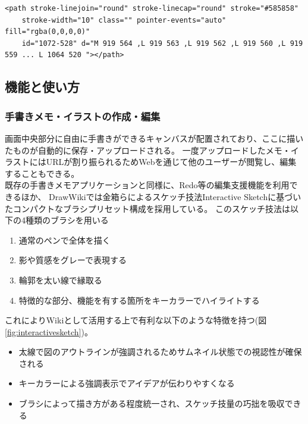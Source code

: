 \begin{lstlisting}[caption=図\ref{fig:tegakipath}の実体, label=code:tegakipathcode]
    <path stroke-linejoin="round" stroke-linecap="round" stroke="#585858"
    stroke-width="10" class="" pointer-events="auto" fill="rgba(0,0,0,0)"
    id="1072-528" d="M 919 564 ,L 919 563 ,L 919 562 ,L 919 560 ,L 919 559 ... L 1064 520 "></path>
\end{lstlisting}


\subsection{機能と使い方}

\subsubsection{手書きメモ・イラストの作成・編集}

画面中央部分に自由に手書きができるキャンバスが配置されており、ここに描いたものが自動的に保存・アップロードされる。
一度アップロードしたメモ・イラストにはURLが割り振られるためWebを通じて他のユーザーが閲覧し、編集することもできる。
\\
既存の手書きメモアプリケーションと同様に、Redo等の編集支援機能を利用できるほか、
DrawWikiでは金箱らによるスケッチ技法Interactive Sketch\cite{130004638060}に基づいたコンパクトなブラシプリセット構成を採用している。
このスケッチ技法は以下の4種類のブラシを用いる
\begin{enumerate}
    \item 通常のペンで全体を描く
    \item 影や質感をグレーで表現する
    \item 輪郭を太い線で縁取る
    \item 特徴的な部分、機能を有する箇所をキーカラーでハイライトする
\end{enumerate}
これによりWikiとして活用する上で有利な以下のような特徴を持つ(図\ref{fig:interactivesketch})。
\begin{itemize}
    \item 太線で図のアウトラインが強調されるためサムネイル状態での視認性が確保される
    \item キーカラーによる強調表示でアイデアが伝わりやすくなる
    \item ブラシによって描き方がある程度統一され、スケッチ技量の巧拙を吸収できる
\end{itemize}

